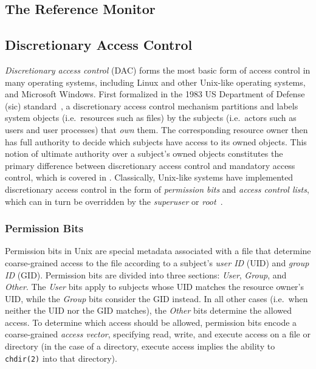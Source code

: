 \subsection{The Reference Monitor}%
\label{ss:refmon}


\subsection{Discretionary Access Control}%
\label{ss:dac}

\textit{Discretionary access control} (DAC) forms the most basic form of access control in
many operating systems, including Linux and other Unix-like operating systems, and
Microsoft Windows. First formalized in the 1983 US Department of Defense (sic)
standard~\cite{orange_book}, a discretionary access control mechanism partitions and
labels system objects (i.e.~resources such as files) by the subjects (i.e.~actors such as
users and user processes) that \textit{own} them. The corresponding resource owner then
has full authority to decide which subjects have access to its owned objects. This notion
of ultimate authority over a subject's owned objects constitutes the primary difference
between discretionary access control and mandatory access control, which is covered in
. Classically, Unix-like systems have implemented discretionary access
control in the form of \textit{permission bits} and \textit{access control lists}, which
can in turn be overridden by the \textit{superuser} or
\textit{root}~\cite{van_oorschot2020_tools_jewels, jaeger2008_os_security}.

\subsubsection*{Permission Bits}

Permission bits in Unix are special metadata associated with a file that determine
coarse-grained access to the file according to a subject's \textit{user ID} (UID) and
\textit{group ID} (GID). Permission bits are divided into three sections: \textit{User},
\textit{Group}, and \textit{Other}. The \textit{User} bits apply to subjects whose UID
matches the resource owner's UID, while the \textit{Group} bits consider the GID instead.
In all other cases (i.e.~when neither the UID nor the GID matches), the \textit{Other}
bits determine the allowed access. To determine which access should be allowed, permission
bits encode a coarse-grained \textit{access vector}, specifying read, write, and execute
access on a file or directory (in the case of a directory, execute access implies the
ability to \texttt{chdir(2)} into that directory).

